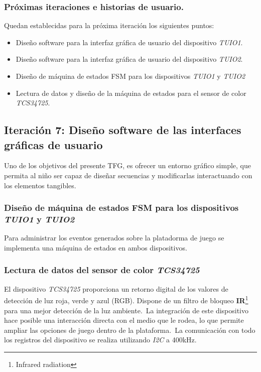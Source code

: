 \subsubsection{Próximas iteraciones e historias de usuario.}
Quedan establecidas para la próxima iteración los siguientes puntos:
\begin{itemize}
\item Diseño software para la interfaz gráfica de usuario del dispositivo \emph{TUIO1}.
\item Diseño software para la interfaz gráfica de usuario del dispositivo \emph{TUIO2}.
\item Diseño de máquina de estados FSM para los dispositivos \emph{TUIO1} y \emph{TUIO2}
\item Lectura de datos y diseño de la máquina de estados para el sensor de color \emph{TCS34725}.
\end{itemize}

\subsection{Iteración 7: Diseño software de las interfaces gráficas de usuario}
Uno de los objetivos del presente TFG, es ofrecer un entorno gráfico simple, que permita al niño ser capaz de diseñar secuencias y modificarlas interactuando con los elementos tangibles.

\subsubsection{Diseño de máquina de estados FSM para los dispositivos \emph{TUIO1} y \emph{TUIO2}}
Para administrar los eventos generados sobre la platadorma de juego se implementa una máquina de estados en ambos dispositivos. 

\subsubsection{Lectura de datos del sensor de color \emph{TCS34725}}
El dispositivo \emph{TCS34725} proporciona un retorno digital de los valores de detección de luz roja, verde y azul (RGB). Dispone de un filtro de bloqueo \textbf{IR}\footnote{Infrared radiation} para una mejor detección de la luz ambiente.\
La integración de este dispositivo hace posible una interacción directa con el medio que le rodea, lo que permite ampliar las opciones de juego dentro de la plataforma.\
La comunicación con todo los registros del dispositivo se realiza utilizando \emph{I2C} a 400kHz.

